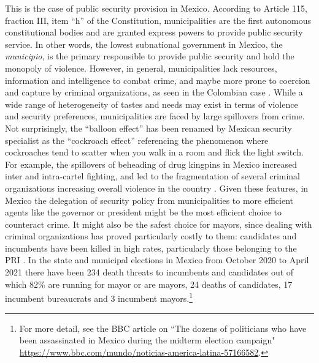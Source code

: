 \documentclass[12pt]{amsart}
\numberwithin{equation}{section}
\theoremstyle{definition}
\theoremstyle{definition}
\theoremstyle{definition}
\begin{document}
This is the case of public security provision in Mexico. According to Article 115, fraction III, item ``h'' of the Constitution, municipalities are the first autonomous constitutional bodies and are granted express powers to provide public security service. In other words, the lowest subnational government in Mexico, the \emph{municipio}, is the primary responsible to provide public security and hold the monopoly of violence. However, in general, municipalities lack resources, information and intelligence to combat crime, and maybe more prone to coercion and capture by criminal organizations, as seen in the Colombian case \citep{chacon_2018}. While a wide range of heterogeneity of tastes and needs may exist in terms of violence and security preferences, municipalities are faced by large spillovers from crime. Not surprisingly, the ``balloon effect'' has been renamed by Mexican security specialist as the ``cockroach effect'' referencing the phenomenon where cockroaches tend to scatter when you walk in a room and flick the light switch. For example, the spillovers of beheading of drug kingpins in Mexico increased inter and intra-cartel fighting, and led to the fragmentation of several criminal organizations increasing overall violence in the country \citep{guerrero_2011}. Given these features, in Mexico the delegation of security policy from municipalities to more efficient agents like the governor or president might be the most efficient choice to counteract crime. It might also be the safest choice for mayors, since dealing with criminal organizations has proved particularly costly to them: candidates and incumbents have been killed in high rates, particularly those belonging to the PRI \citep{ley_trejo_2020}. In the  state and municipal elections in Mexico from October 2020 to April 2021 there have been 234 death threats to incumbents and candidates out of which 82\% are running for mayor or are mayors, 24 deaths of candidates, 17 incumbent bureaucrats and 3 incumbent mayors.\footnote{For more detail, see the BBC article on ``The dozens of politicians who have been assassinated in Mexico during the midterm election campaign" \url{https://www.bbc.com/mundo/noticias-america-latina-57166582}.} 
\end{document}
